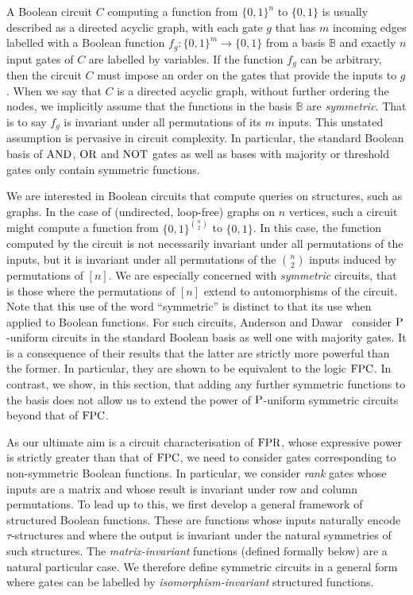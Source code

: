 \documentclass[../paper.tex]{subfiles}
\begin{document}


A Boolean circuit $C$ computing a function from $\{0,1\}^n$ to $\{0,1\}$ is
usually described as a directed acyclic graph, with each gate $g$ that has $m$
incoming edges labelled with a Boolean function $f_g : \{0,1\}^m \rightarrow
\{0,1\}$ from a basis $\mathbb{B}$ and exactly $n$ input gates of $C$ are
labelled by variables. If the function $f_g$ can be arbitrary, then the circuit
$C$ must impose an order on the gates that provide the inputs to $g$. When we
say that $C$ is a directed acyclic graph, without further ordering the nodes, we
implicitly assume that the functions in the basis $\mathbb{B}$ are
\emph{symmetric}. That is to say $f_g$ is invariant under all permutations of
its $m$ inputs. This unstated assumption is pervasive in circuit complexity. In
particular, the standard Boolean basis of $\text{\upshape AND}$, $\text{\upshape OR}$ and $\text{\upshape NOT}$ gates as well as bases
with majority or threshold gates only contain symmetric functions.

We are interested in Boolean circuits that compute queries on structures, such
as graphs. In the case of (undirected, loop-free) graphs on $n$ vertices, such a
circuit might compute a function from $\{0,1\}^{n \choose 2}$ to $\{0,1\}$. In
this case, the function computed by the circuit is not necessarily invariant
under all permutations of the inputs, but it is invariant under all permutations
of the $n \choose 2$ inputs induced by permutations of $[n]$. We are especially
concerned with \emph{symmetric} circuits, that is those where the permutations
of $[n]$ extend to automorphisms of the circuit. Note that this use of the word
``symmetric'' is distinct to that its use when applied to Boolean functions. For
such circuits, Anderson and Dawar~\cite{AndersonD17} consider $\mathrm{P}$-uniform
circuits in the standard Boolean basis as well one with majority gates. It is a
consequence of their results that the latter are strictly more powerful than the
former. In particular, they are shown to be equivalent to the logic $\text{\upshape FPC}$. In
contrast, we show, in this section, that adding any further symmetric functions
to the basis does not allow us to extend the power of $\mathrm{P}$-uniform symmetric
circuits beyond that of $\text{\upshape FPC}$.



As our ultimate aim is a circuit characterisation of $\text{\upshape FPR}$, whose expressive power is
strictly greater than that of $\text{\upshape FPC}$, we need to consider gates corresponding to
non-symmetric Boolean functions. In particular, we consider \emph{rank} gates
whose inputs are a matrix and whose result is invariant under row and column
permutations. To lead up to this, we first develop a general framework of
structured Boolean functions. These are functions whose inputs naturally encode
$\tau$-structures and where the output is invariant under the natural symmetries
of such structures. The \emph{matrix-invariant} functions (defined
formally below) are a natural
particular case. We therefore define symmetric circuits in a general form where
gates can be labelled by \emph{isomorphism-invariant} structured functions.
\end{document}

